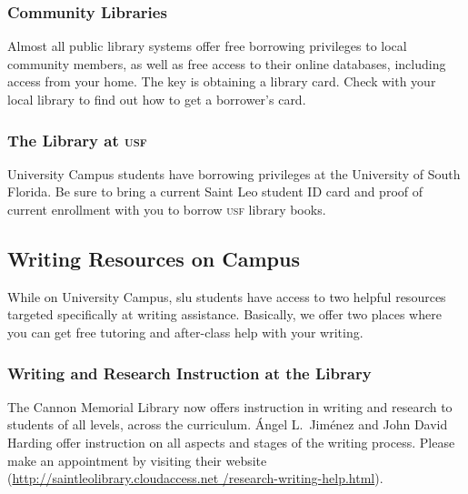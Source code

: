 \documentclass[12pt,oneside]{amsart}	%
\begin{document}
\subsubsection{Community Libraries} %
\label{ssub:community_libraries}
Almost all public library systems offer free borrowing privileges to local community members, as well as free access to their online databases, including access from your home.  The key is obtaining a library card.  Check with your local library to find out how to get a borrower’s card.  

\subsubsection{The Library at \textsc{usf}} %
\label{ssub:the_library_at_}
University Campus students have borrowing privileges at the University of South Florida.  Be sure to bring a current Saint Leo student ID card and proof of current enrollment with you to borrow \textsc{usf} library books.


\subsection{Writing Resources on Campus} %
\label{sub:writing_resources_on_campus}
While on University Campus, \ac{slu} students have access to two helpful resources targeted specifically at writing assistance. Basically, we offer two places where you can get free tutoring and after-class help with your writing.

\subsubsection{Writing and Research Instruction at the Library} %
\label{ssub:writing_and_research_instruction_at_the_library}
The Cannon Memorial Library now offers instruction in writing and research to students of all levels, across the curriculum. Ángel L.\ Jiménez and John David Harding offer instruction on all aspects and stages of the writing process. Please make an appointment by visiting their website (\href{http://saintleolibrary.cloudaccess.net/research-writing-help.html}{http://saintleolibrary.cloudaccess.net /research-writing-help.html}).

\end{document}
